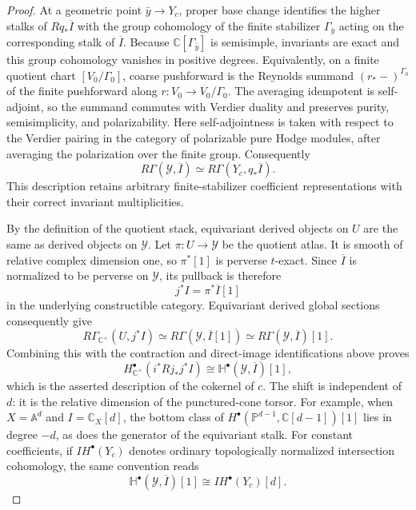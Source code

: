 \documentclass[11pt]{amsart}
\theoremstyle{definition}
\theoremstyle{remark}
\begin{document}
\begin{proof}
At a geometric point
$\bar y\to Y_c$, proper base change identifies the higher stalks of
$Rq_*\overline I$ with the group cohomology of the finite stabilizer
$\Gamma_{\bar y}$ acting on the corresponding stalk of $\overline I$.
Because $\mathbb C[\Gamma_{\bar y}]$ is semisimple, invariants are exact and
this group cohomology vanishes in positive degrees.  Equivalently, on a
finite quotient chart $[V_0/\Gamma_0]$, coarse pushforward is the Reynolds
summand $(r_*-)^{\Gamma_0}$ of the finite pushforward along
$r:V_0\to V_0/\Gamma_0$.  The averaging idempotent is self-adjoint, so the
summand commutes with Verdier duality and preserves purity, semisimplicity,
and polarizability.  Here self-adjointness is taken with respect to the
Verdier pairing in the category of polarizable pure Hodge modules, after
averaging the polarization over the finite group.  Consequently
\[
 R\Gamma(\mathcal Y,\overline I)
 \simeq R\Gamma(Y_c,q_*\overline I).
\]
This description retains arbitrary finite-stabilizer coefficient
representations with their correct invariant multiplicities.

By the definition of the quotient stack, equivariant derived objects on
$U$ are the same as derived objects on $\mathcal Y$.  Let
$\pi:U\to\mathcal Y$ be the quotient atlas.  It is smooth of relative
complex dimension one, so $\pi^*[1]$ is perverse $t$-exact.  Since
$\overline I$ is normalized to be perverse on $\mathcal Y$, its pullback is
therefore
\[
 j^*I=\pi^*\overline I[1]
\]
in the underlying constructible category.  Equivariant derived global
sections consequently give
\[
 R\Gamma_{\mathbb C^\times}(U,j^*I)
 \simeq R\Gamma(\mathcal Y,\overline I[1])
 \simeq R\Gamma(\mathcal Y,\overline I)[1].
\]
Combining this with the contraction and direct-image identifications above
proves
\[
 H^\bullet_{\mathbb C^\times}(i^*Rj_*j^*I)
 \cong \mathbb H^\bullet(\mathcal Y,\overline I)[1],
\]
which is the asserted description of the cokernel of $c$.  The shift is
independent of $d$: it is the relative dimension of the punctured-cone
torsor.  For
example, when $X=\mathbb A^d$ and $I=\mathbb C_X[d]$, the bottom class of
$H^\bullet(\mathbb P^{d-1},\mathbb C[d-1])[1]$ lies in degree $-d$, as does
the generator of the equivariant stalk.
For constant coefficients, if $IH^\bullet(Y_c)$ denotes ordinary
topologically normalized intersection cohomology, the same convention reads
\[
 \mathbb H^\bullet(\mathcal Y,\overline I)[1]
 \cong IH^\bullet(Y_c)[d].
\]


\end{proof}
\end{document}
